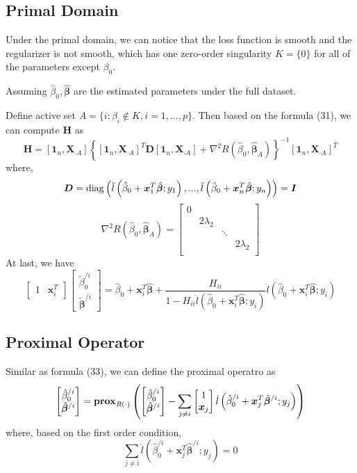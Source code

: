 \documentclass[letter]{article}
\begin{document}
	\subsection{Primal Domain}
	
	Under the primal domain, we can notice that the loss function is smooth and the regularizer is not smooth, which has one zero-order singularity $K=\{0\}$ for all of the parameters except $\beta_0$.
	
	Assuming $\hat{\beta}_0,\hat{\bm{\beta}}$ are the estimated parameters under the full dataset.
	
	Define active set $A=\{i:\beta_i\not\in K,i=1,...,p\}$. Then based on the formula (31), we can compute $\bm{H}$ as 
	$$\bm{H}=\left[\bm{1}_n,\bm{X}_{\cdot A}\right]\left\{\left[\bm{1}_n,\bm{X}_{\cdot A}\right]^T\bm{D}\left[\bm{1}_n,\bm{X}_{\cdot A}\right]+\nabla^2R\left(\hat{\beta}_0,\hat{\bm{\beta}}_A\right)\right\}^{-1}\left[\bm{1}_n,\bm{X}_{\cdot A}\right]^T$$
	where,
	$$\bm{D}={\rm diag}\left(\ddot{l}\left(\hat{\beta}_0+\bm{x}_1^T\hat{\bm{\beta}};y_1\right),...,\ddot{l}\left(\hat{\beta}_0+\bm{x}_n^T\hat{\bm{\beta}};y_n\right)\right)=\bm{I}$$
	$$\nabla^2R\left(\hat{\beta}_0,\hat{\bm{\beta}}_A\right)=\begin{bmatrix}
	0 & & & \\
	& 2\lambda_2 & & \\
	& & \ddots & \\
	& & & 2\lambda_2 \\
	\end{bmatrix}$$
	At last, we have
	$$\begin{bmatrix}
	1 & \bm{x}_i^T\end{bmatrix}
	\begin{bmatrix}
	\tilde{\beta}_0^{/i} \\
	\tilde{\bm{\beta}}^{/i}\end{bmatrix}=\hat{\beta}_0+\bm{x}_i^T\hat{\bm{\beta}}+\frac{H_{ii}}{1-H_{ii}\ddot{l}\left(\hat{\beta}_0+\bm{x}_i^T\hat{\bm{\beta}};y_i\right)}\dot{l}\left(\hat{\beta}_0+\bm{x}_i^T\hat{\bm{\beta}};y_i\right)$$
	
	\subsection{Proximal Operator}
	
	Similar as formula (33), we can define the proximal operatro as
	$$\begin{bmatrix}
	\hat{\beta}_0^{/i} \\
	\hat{\bm{\beta}}^{/i}\end{bmatrix}=
	\bm{{\rm prox}}_{R(\cdot)}\left(\begin{bmatrix}
	\hat{\beta}_0^{/i} \\
	\hat{\bm{\beta}}^{/i}\end{bmatrix}-
	\sum_{j\neq i}\begin{bmatrix}
	1 \\
	\bm{x}_j\end{bmatrix}
	\dot{l}\left(\hat{\beta}_0^{/i}+\bm{x}_j^T\hat{\bm{\beta}}^{/i};y_j\right)\right)$$
	where, based on the first order condition, 
	$$\sum_{j\neq i}
	\dot{l}\left(\hat{\beta}_0^{/i}+\bm{x}_j^T\hat{\bm{\beta}}^{/i};y_j\right)=0$$
	
\end{document}
